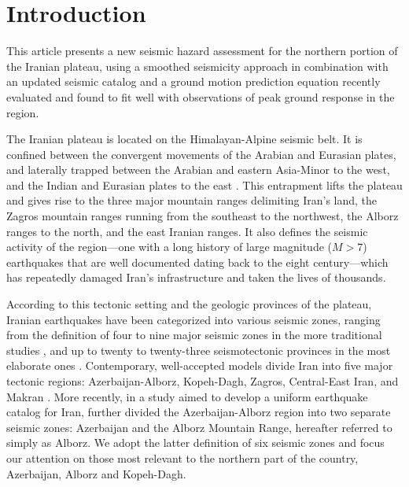 
\section{Introduction}

This article presents a new seismic hazard assessment for the northern portion of the Iranian plateau, using a smoothed seismicity approach in combination with an updated seismic catalog and a ground motion prediction equation recently evaluated and found to fit well with observations of peak ground response in the region. 

The Iranian plateau is located on the Himalayan-Alpine seismic belt. It is confined between the convergent movements of the Arabian and Eurasian plates, and laterally trapped between the Arabian and eastern Asia-Minor to the west, and the Indian and Eurasian plates to the east \citep{Berberian_1981_Chap}. This entrapment lifts the plateau and gives rise to the three major mountain ranges delimiting Iran's land, the Zagros mountain ranges running from the southeast to the northwest, the Alborz ranges to the north, and the east Iranian ranges. It also defines the seismic activity of the region---one with a long history of large magnitude ($M>7$) earthquakes that are well documented dating back to the eight century---which has repeatedly damaged Iran's infrastructure and taken the lives of thousands. 

According to this tectonic setting and the geologic provinces of the plateau, Iranian earthquakes have been categorized into various seismic zones, ranging from the definition of four to nine major seismic zones in the more traditional studies \citep[e.g.,][]{Stocklin1968, Takin1972, Berberian1976}, and up to twenty to twenty-three seismotectonic provinces in the most elaborate ones \citep[e.g.,][]{Nowroozi1976, Tavakoli1999}. Contemporary, well-accepted models divide Iran into five major tectonic regions: Azerbaijan-Alborz, Kopeh-Dagh, Zagros, Central-East Iran, and Makran \citep[e.g.,][]{Mirzaei1998}. More recently, in a study aimed to develop a uniform earthquake catalog for Iran, \citet{Karimiparidari2013} further divided the Azerbaijan-Alborz region into two separate seismic zones: Azerbaijan and the Alborz Mountain Range, hereafter referred to simply as Alborz. We adopt the latter definition of six seismic zones and focus our attention on those most relevant to the northern part of the country, Azerbaijan, Alborz and Kopeh-Dagh.


